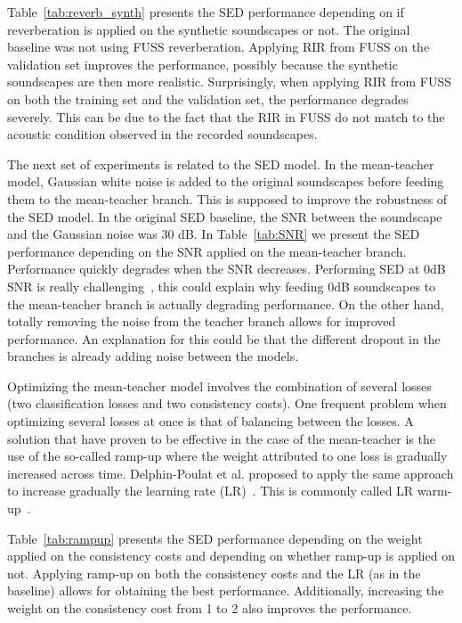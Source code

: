 \documentclass{article}
\begin{document}
\begin{sloppy}
Table~\ref{tab:reverb_synth} presents the SED performance depending on if reverberation is applied on the synthetic soundscapes or not. The original baseline was not using FUSS reverberation. Applying RIR from FUSS on the validation set improves the performance, possibly because the synthetic soundscapes are then more realistic. Surprisingly, when applying RIR from FUSS on both the training set and the validation set, the performance degrades severely. This can be due to the fact that the RIR in FUSS do not match to the acoustic condition observed in the recorded soundscapes.


The next set of experiments is related to the SED model. In the mean-teacher model, Gaussian white noise is added to the original soundscapes before feeding them to the mean-teacher branch. This is supposed to improve the robustness of the SED model. In the original SED baseline, the SNR between the soundscape and the Gaussian noise was 30 dB. In Table~\ref{tab:SNR} we present the SED performance depending on the SNR applied on the mean-teacher branch. Performance quickly degrades when the SNR decreases. Performing SED at 0dB SNR is really challenging~\cite{serizel_2020}, this could explain why feeding 0dB soundscapes to the mean-teacher branch is actually degrading performance. On the other hand, totally removing the noise from the teacher branch allows for improved performance. An explanation for this could be that the different dropout in the branches is already adding noise between the models.


Optimizing the mean-teacher model involves the combination of several losses (two classification losses and two consistency costs). One frequent problem when optimizing several losses at once is that of balancing between the losses. A solution that have proven to be effective in the case of the mean-teacher is the use of the so-called ramp-up where the weight attributed to one loss is gradually increased across time. Delphin-Poulat et al. proposed to apply the same approach to increase gradually the learning rate (LR)~\cite{Delphin-Poulat2019}. This is commonly called LR warm-up~\cite{goyal2017accurate}.

Table~\ref{tab:rampup} presents the SED performance depending on the weight applied on the consistency costs and depending on whether ramp-up is applied on not. Applying ramp-up on both the consistency costs and the LR (as in the baseline) allows for obtaining the best performance. Additionally, increasing the weight on the consistency cost from 1 to 2 also improves the performance.


\end{sloppy}
\end{document}
